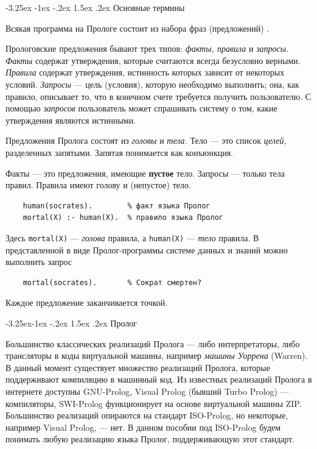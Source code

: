 \documentclass[12pt, openany, twoside]{book} %
\makeatletter
\renewcommand\section{\@startsection {section}{1}{\z@}%
                                   {-3.25ex \@plus -1ex \@minus -.2ex}%
                                   {1.5ex \@plus.2ex}%
                                   {\normalfont\large\bfseries}}
\renewcommand\subsection{\@startsection{subsection}{2}{\z@}%
                                     {-3.25ex\@plus -1ex \@minus -.2ex}%
                                     {1.5ex \@plus .2ex}%
                                     {\normalfont\normalsize\bfseries}}
\makeatother
\begin{document}
\section{Основные термины}

Всякая программа на Прологе состоит из набора фраз (предложений) \cite{Bratko}.

Прологовские предложения бывают трех типов: \emph{факты, правила} и \emph{запросы.} \emph{Факты} содержат утверждения, которые считаются всегда безусловно верными. \emph{Правила} содержат утверждения, истинность которых зависит от некоторых условий. \emph{Запросы} --- цель (условия), которую необходимо выполнить; она, как правило, описывает то, что в конечном счете требуется получить пользователю. С помощью \emph{запросов} пользователь может спрашивать систему о том, какие утверждения являются истинными.

Предложения Пролога состоят из \emph{головы} и \emph{тела.} Тело --- это список \emph{целей,} разделенных запятыми. Запятая понимается как конъюнкция.

Факты --- это предложения, имеющие {\bf пустое} тело. Запросы --- только тела правил. Правила имеют голову и (непустое) тело.

{\tt\begin{verbatim}
    human(socrates).        % факт языка Пролог
    mortal(X) :- human(X).  % правило языка Пролог
\end{verbatim}}

Здесь {\tt mortal(X)} --- {\em голова} правила, а {\tt human(X)} --- {\em тело} правила. В представленной в виде Пролог-программы системе данных и знаний можно выполнить запрос
{\tt\begin{verbatim}
    mortal(socrates).       % Сократ смертен?
\end{verbatim}}
Каждое предложение заканчивается точкой.


\subsection{Пролог}

Большинство классических реализаций Пролога --- либо интерпретаторы, либо трансляторы в коды виртуальной машины, например {\em машины Уоррена} (Warren). В данный момент существует множество реализаций Пролога, которые поддерживают компиляцию в машинный код. Из известных реализаций Пролога в интернете доступны GNU-Prolog, Visual Prolog (бывший Turbo Prolog) --- компиляторы, SWI-Prolog функционирует на основе виртуальной машины ZIP. Большинство реализаций опираются на стандарт ISO-Prolog, но некоторые, например Visual Prolog, --- нет. В данном пособии под ISO-Prolog будем понимать любую реализацию языка Пролог, поддерживающую этот стандарт.
\end{document}

